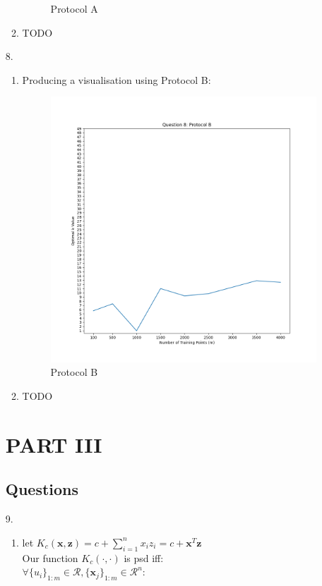 \documentclass[12pt]{article}
\begin{document}
\begin{enumerate}[leftmargin=\labelsep]
\begin{enumerate}
\begin{figure}[h]
            \caption{Protocol A}
            \label{fig:7}
            \end{figure}
        \item TODO
    \end{enumerate}
\newpage
\item[8.]
    \begin{enumerate}
        \item Producing a visualisation using Protocol B:
            \begin{figure}[h]
            \centering
            \includegraphics[scale=0.5]{outputs/python/q8/q8}
            \caption{Protocol B}
            \label{fig:8}
            \end{figure}
        \item TODO
    \end{enumerate}
\newpage
\section{PART III}
\subsection{Questions}
\item[9.] \begin{enumerate}
              \item let $K_{c}(\textbf{x},\textbf{z}) = c+ \sum_{i=1}^{n}x_{i}z_{i} = c + \textbf{x}^{T}\textbf{z}$\\
        Our function $K_{c}(\cdot, \cdot)$ is psd iff:\\
        $\forall \{ u_{i} \}_{1:m} \in \mathcal{R},
         \{ \textbf{x}_{j}\}_{1:m} \in \mathcal{R}^{n}$:


\end{enumerate}
\end{enumerate}
\end{document}

